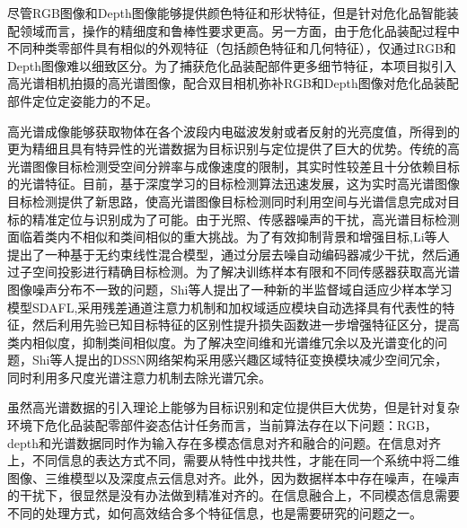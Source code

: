 \documentclass[12pt]{article}
\begin{document}

尽管RGB图像和Depth图像能够提供颜色特征和形状特征，但是针对危化品智能装配领域而言，操作的精细度和鲁棒性要求更高。另一方面，由于危化品装配过程中不同种类零部件具有相似的外观特征（包括颜色特征和几何特征），仅通过RGB和Depth图像难以细致区分。为了捕获危化品装配部件更多细节特征，本项目拟引入高光谱相机拍摄的高光谱图像，配合双目相机弥补RGB和Depth图像对危化品装配部件定位定姿能力的不足。

高光谱成像能够获取物体在各个波段内电磁波发射或者反射的光亮度值，所得到的更为精细且具有特异性的光谱数据为目标识别与定位提供了巨大的优势。传统的高光谱图像目标检测受空间分辨率与成像速度的限制，其实时性较差且十分依赖目标的光谱特征。目前，基于深度学习的目标检测算法迅速发展，这为实时高光谱图像目标检测提供了新思路，使高光谱图像目标检测同时利用空间与光谱信息完成对目标的精准定位与识别成为了可能。由于光照、传感器噪声的干扰，高光谱目标检测面临着类内不相似和类间相似的重大挑战。为了有效抑制背景和增强目标,Li等人\cite{lys2022targetDetection}提出了一种基于无约束线性混合模型，通过分层去噪自动编码器减少干扰，然后通过子空间投影进行精确目标检测。为了解决训练样本有限和不同传感器获取高光谱图像噪声分布不一致的问题，Shi等人\cite{shi2020HyperspectralTargetDetection}提出了一种新的半监督域自适应少样本学习模型SDAFL,采用残差通道注意力机制和加权域适应模块自动选择具有代表性的特征，然后利用先验已知目标特征的区别性提升损失函数进一步增强特征区分，提高类内相似度，抑制类间相似度。为了解决空间维和光谱维冗余以及光谱变化的问题，Shi等人\cite{shi2020hyperspectralROI}提出的DSSN网络架构采用感兴趣区域特征变换模块减少空间冗余，同时利用多尺度光谱注意力机制去除光谱冗余。

虽然高光谱数据的引入理论上能够为目标识别和定位提供巨大优势，但是针对复杂环境下危化品装配零部件姿态估计任务而言，当前算法存在以下问题：RGB，depth和光谱数据同时作为输入存在多模态信息对齐和融合的问题。在信息对齐上，不同信息的表达方式不同，需要从特性中找共性，才能在同一个系统中将二维图像、三维模型以及深度点云信息对齐。此外，因为数据样本中存在噪声，在噪声的干扰下，很显然是没有办法做到精准对齐的。在信息融合上，不同模态信息需要不同的处理方式，如何高效结合多个特征信息，也是需要研究的问题之一。
\end{document}
